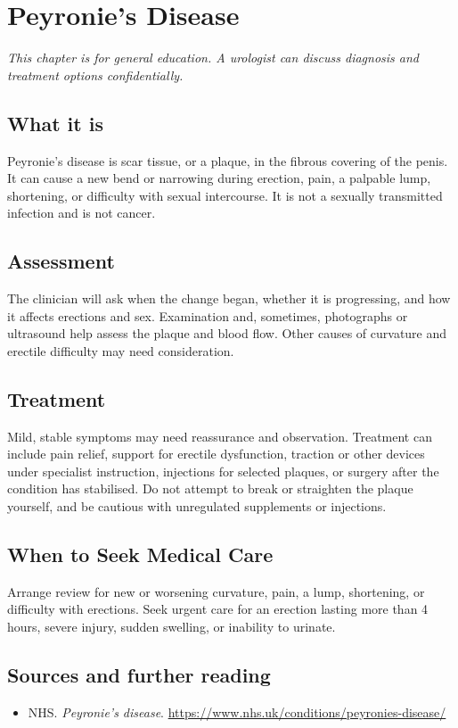 \chapter{Peyronie's Disease}

\medskip
\noindent\textit{This chapter is for general education. A urologist can discuss diagnosis and treatment options confidentially.}

\section*{What it is}
Peyronie's disease is scar tissue, or a plaque, in the fibrous covering of the penis. It can cause a new bend or narrowing during erection, pain, a palpable lump, shortening, or difficulty with sexual intercourse. It is not a sexually transmitted infection and is not cancer.

\section*{Assessment}
The clinician will ask when the change began, whether it is progressing, and how it affects erections and sex. Examination and, sometimes, photographs or ultrasound help assess the plaque and blood flow. Other causes of curvature and erectile difficulty may need consideration.

\section*{Treatment}
Mild, stable symptoms may need reassurance and observation. Treatment can include pain relief, support for erectile dysfunction, traction or other devices under specialist instruction, injections for selected plaques, or surgery after the condition has stabilised. Do not attempt to break or straighten the plaque yourself, and be cautious with unregulated supplements or injections.

\section*{When to Seek Medical Care}
Arrange review for new or worsening curvature, pain, a lump, shortening, or difficulty with erections. Seek urgent care for an erection lasting more than 4 hours, severe injury, sudden swelling, or inability to urinate.

\section*{Sources and further reading}
\begin{itemize}
\item NHS. \textit{Peyronie's disease}. \url{https://www.nhs.uk/conditions/peyronies-disease/}
\end{itemize}
